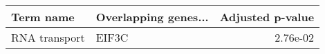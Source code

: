 \begin{tabular}{llr}
\toprule
    Term name & Overlapping genes... &  Adjusted p-value \\
\midrule
RNA transport &                EIF3C &          2.76e-02 \\
\bottomrule
\end{tabular}
